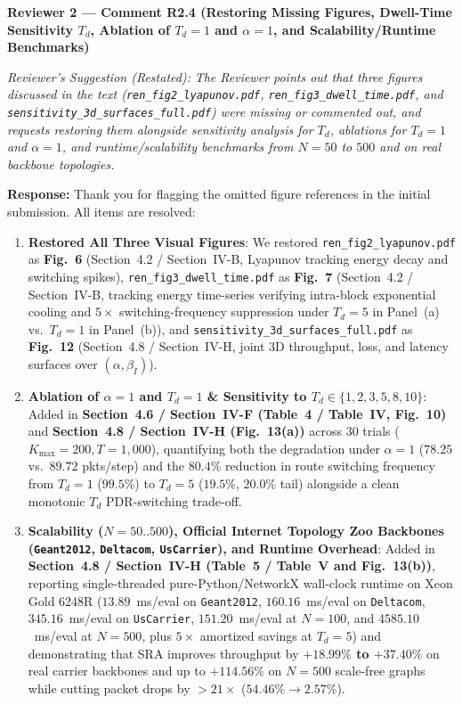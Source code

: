 \documentclass[11pt,a4paper]{article}
\newcommand{\cbox}[2]{%
  \vspace{0.6em}\noindent\textbf{#1}\par\smallskip
  \noindent\textit{Reviewer's Suggestion (Restated):} \textit{#2}\par\smallskip
}
\begin{document}
\hrulefill

\cbox{Reviewer 2 --- Comment R2.4 (Restoring Missing Figures, Dwell-Time Sensitivity $T_d$, Ablation of $T_d=1$ and $\alpha=1$, and Scalability/Runtime Benchmarks)}{The Reviewer points out that three figures discussed in the text (\texttt{ren\_fig2\_lyapunov.pdf}, \texttt{ren\_fig3\_\allowbreak dwell\_time.pdf}, and \texttt{sensitivity\_3d\_\allowbreak surfaces\_full.pdf}) were missing or commented out, and requests restoring them alongside sensitivity analysis for $T_d$, ablations for $T_d=1$ and $\alpha=1$, and runtime/scalability benchmarks from $N=50$ to $500$ and on real backbone topologies.}

\noindent\textbf{Response:} Thank you for flagging the omitted figure references in the initial submission. All items are resolved:
\begin{enumerate}[leftmargin=1.8em]
    \item \textbf{Restored All Three Visual Figures}: We restored \texttt{ren\_fig2\_lyapunov.pdf} as \textbf{Fig.~6} (Section~4.2 / Section~IV-B, Lyapunov tracking energy decay and switching spikes), \texttt{ren\_fig3\_\allowbreak dwell\_time.pdf} as \textbf{Fig.~7} (Section~4.2 / Section~IV-B, tracking energy time-series verifying intra-block exponential cooling and $5\times$ switching-frequency suppression under $T_d=5$ in Panel~(a) vs.\ $T_d=1$ in Panel~(b)), and \texttt{sensitivity\_3d\_\allowbreak surfaces\_full.pdf} as \textbf{Fig.~12} (Section~4.8 / Section~IV-H, joint 3D throughput, loss, and latency surfaces over $(\alpha, \beta_I)$).
    \item \textbf{Ablation of $\alpha=1$ and $T_d=1$ \& Sensitivity to $T_d \in \{1, 2, 3, 5, 8, 10\}$}: Added in \textbf{Section~4.6 / Section~IV-F (Table~4 / Table~IV, Fig.~10)} and \textbf{Section~4.8 / Section~IV-H (Fig.~13(a))} across 30 trials ($K_{\max}=200, T=1{,}000$), quantifying both the degradation under $\alpha=1$ ($78.25$ vs.\ $89.72$ pkts/step) and the $80.4\%$ reduction in route switching frequency from $T_d=1$ ($99.5\%$) to $T_d=5$ ($19.5\%$, $20.0\%$ tail) alongside a clean monotonic $T_d$ PDR-switching trade-off.
    \item \textbf{Scalability ($N=50..500$), Official Internet Topology Zoo Backbones (\texttt{Geant2012}, \texttt{Deltacom}, \texttt{UsCarrier}), and Runtime Overhead}: Added in \textbf{Section~4.8 / Section~IV-H (Table~5 / Table~V and Fig.~13(b))}, reporting single-threaded pure-Python/NetworkX wall-clock runtime on Xeon Gold 6248R ($13.89$~ms/eval on \texttt{Geant2012}, $160.16$~ms/eval on \texttt{Deltacom}, $345.16$~ms/eval on \texttt{UsCarrier}, $151.20$~ms/eval at $N=100$, and $4585.10$~ms/eval at $N=500$, plus $5\times$ amortized savings at $T_d=5$) and demonstrating that SRA improves throughput by \textbf{$+18.99\%$ to $+37.40\%$} on real carrier backbones and up to \textbf{$+114.56\%$} on $N=500$ scale-free graphs while cutting packet drops by $>21\times$ ($54.46\% \to 2.57\%$).
\end{enumerate}
\end{document}
